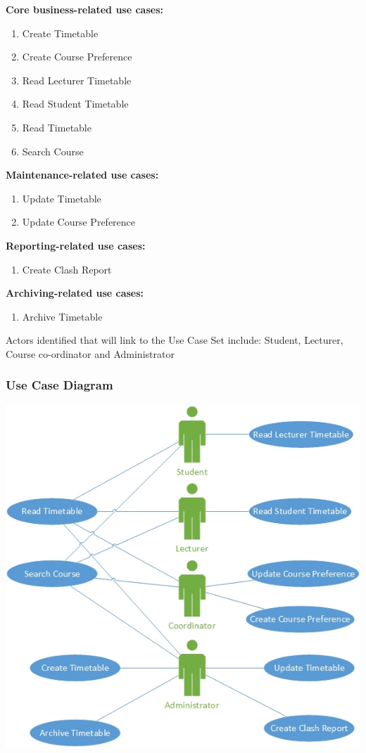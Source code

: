 \documentclass{article}
\begin{document}
\textbf{Core business-related use cases:}
\begin{enumerate}[nosep]
\item Create Timetable
\item Create Course Preference
\item Read Lecturer Timetable
\item Read Student Timetable 
\item Read Timetable
\item Search Course
\end{enumerate}

\textbf{Maintenance-related use cases:}
\begin{enumerate}
\item Update Timetable
\item Update Course Preference
\end{enumerate}

\textbf{Reporting-related use cases:}
\begin{enumerate}
\item Create Clash Report
\end{enumerate}

\textbf{Archiving-related use cases:}
\begin{enumerate}
\item Archive Timetable
\end{enumerate}

Actors identified that will link to the Use Case Set include: Student, Lecturer, Course co-ordinator and Administrator

\subsubsection{Use Case Diagram}

\centerline{\includegraphics[scale=0.75]{UseCaseDiagram}} 
\end{document}
